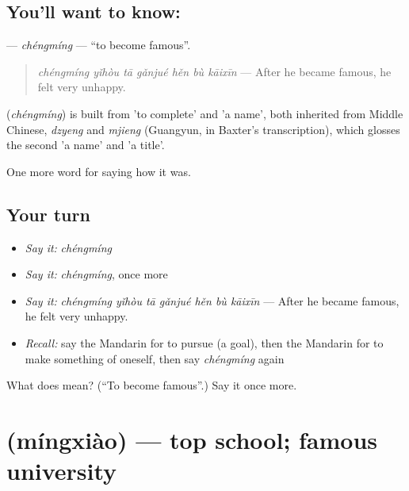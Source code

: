 \subsection*{You'll want to know: }
\textbf{} — \emph{chéngmíng} — \textquotedblleft{}to become famous\textquotedblright{}.

\begin{quote}
\textbf{} \emph{chéngmíng yǐhòu tā gǎnjué hěn bù kāixīn} — After he became famous, he felt very unhappy.
\end{quote}

\begin{cousinweb}
\textbf{} (\emph{chéngmíng}) is built from  'to complete' and  'a name', both inherited from Middle Chinese, \emph{dzyeng} and \emph{mjieng} (Guangyun, in Baxter's transcription), which glosses the second 'a name' and 'a title'.
\end{cousinweb}

\begin{grammarlens}[title={What you've built}]
One more word for saying how it was.
\end{grammarlens}

\subsection*{Your turn}
\begin{itemize}
\raggedright
  \item \emph{Say it:} \emph{chéngmíng}
  \item \emph{Say it:} \emph{chéngmíng}, once more
  \item \emph{Say it:} \emph{chéngmíng yǐhòu tā gǎnjué hěn bù kāixīn} — After he became famous, he felt very unhappy.
  \item \emph{Recall:} say the Mandarin for to pursue (a goal), then the Mandarin for to make something of oneself, then say \emph{chéngmíng} again
\end{itemize}

\begin{tcolorbox}[breakable,colback=teal!4,colframe=teal!35!black,title={Before you move on}]
What does  mean? (\textquotedblleft{}To become famous\textquotedblright{}.) Say it once more.
\end{tcolorbox}
\section[\texorpdfstring{\zh{名校} (míngxiào)}{名校 (míngxiào)}]{ (míngxiào) — top school; famous university}


